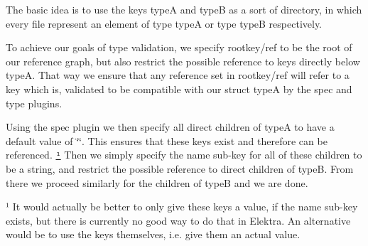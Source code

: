 The basic idea is to use the keys {\ttfamily typeA} and {\ttfamily typeB} as a sort of \textquotesingle{}directory\textquotesingle{}, in which every \textquotesingle{}file\textquotesingle{} represent an element of type {\ttfamily typeA} or type {\ttfamily typeB} respectively.

To achieve our goals of type validation, we specify {\ttfamily rootkey/ref} to be the root of our reference graph, but also restrict the possible reference to keys directly below {\ttfamily typeA}. That way we ensure that any reference set in {\ttfamily rootkey/ref} will refer to a key which is, validated to be compatible with our {\ttfamily struct typeA} by the spec and type plugins.

Using the spec plugin we then specify all direct children of {\ttfamily typeA} to have a default value of {\ttfamily \char`\"{}\char`\"{}}. This ensures that these keys exist and therefore can be referenced. \href{#note-empty-val}{\tt ¹} Then we simply specify the {\ttfamily name} sub-\/key for all of these children to be a string, and restrict the possible reference to direct children of {\ttfamily typeB}. From there we proceed similarly for the children of {\ttfamily typeB} and we are done. 



¹ It would actually be better to only give these keys a value, if the {\ttfamily name} sub-\/key exists, but there is currently no good way to do that in Elektra. An alternative would be to use the keys themselves, i.\+e. give them an actual value. 